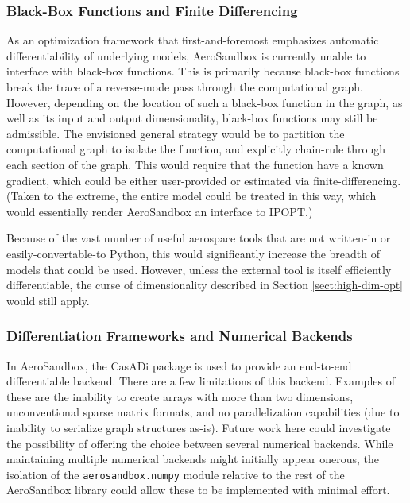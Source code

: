 \subsubsection{Black-Box Functions and Finite Differencing}
\label{sect:future-work-black-box}

As an optimization framework that first-and-foremost emphasizes automatic differentiability of underlying models, AeroSandbox is currently unable to interface with black-box functions. This is primarily because black-box functions break the trace of a reverse-mode pass through the computational graph. However, depending on the location of such a black-box function in the graph, as well as its input and output dimensionality, black-box functions may still be admissible. The envisioned general strategy would be to partition the computational graph to isolate the function, and explicitly chain-rule through each section of the graph. This would require that the function have a known gradient, which could be either user-provided or estimated via finite-differencing. (Taken to the extreme, the entire model could be treated in this way, which would essentially render AeroSandbox an interface to IPOPT.)

Because of the vast number of useful aerospace tools that are not written-in or easily-convertable-to Python, this would significantly increase the breadth of models that could be used. However, unless the external tool is itself efficiently differentiable, the curse of dimensionality described in Section \ref{sect:high-dim-opt} would still apply.


\subsubsection{Differentiation Frameworks and Numerical Backends}

In AeroSandbox, the CasADi package is used to provide an end-to-end differentiable backend. There are a few limitations of this backend. Examples of these are the inability to create arrays with more than two dimensions, unconventional sparse matrix formats, and no parallelization capabilities (due to inability to serialize graph structures as-is). Future work here could investigate the possibility of offering the choice between several numerical backends. While maintaining multiple numerical backends might initially appear onerous, the isolation of the \texttt{aerosandbox.numpy} module relative to the rest of the AeroSandbox library could allow these to be implemented with minimal effort.

